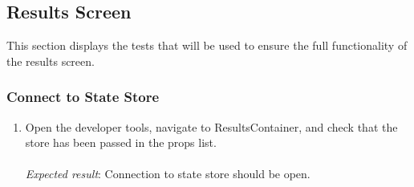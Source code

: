\subsection{Results Screen} %
\label{sub:results_screen}
This section displays the tests that will be used to ensure the full functionality of the results screen.

\subsubsection{Connect to State Store} %
\label{ssub:connect_to_state_store}
\begin{enumerate}[leftmargin=*]
\item Open the developer tools, navigate to ResultsContainer, and check that the store has been passed in the props list.\\\\
\textit{Expected result}: Connection to state store should be open.
\end{enumerate}
